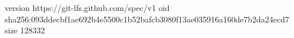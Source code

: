 version https://git-lfs.github.com/spec/v1
oid sha256:093ddecbf1ae692b4e5500c1b52bafcb3080f13ae035916a160de7b2da24ecd7
size 128332
